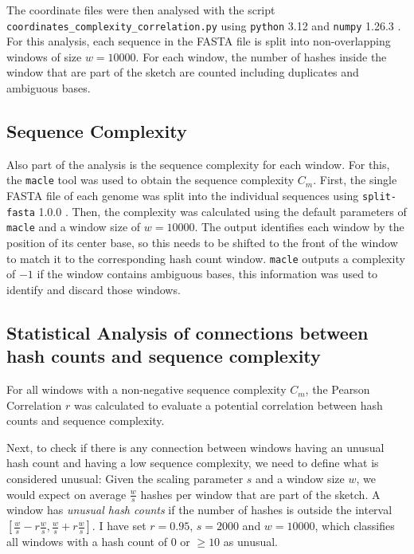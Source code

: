 The coordinate files were then analysed with the script
\texttt{coordinates\_complexity\_correlation.py} using \texttt{python} 3.12
\cite{vanrossumPythonReferenceManual2009} and \texttt{numpy} 1.26.3
\cite{ArrayProgrammingNumPy}. For this analysis, each sequence in the FASTA file
is split into non-overlapping windows of size $w=10000$. For each window, the
number of hashes inside the window that are part of the sketch are counted
including duplicates and ambiguous bases.

\subsection*{Sequence Complexity}
Also part of the analysis is the sequence complexity for each window. For this,
the \texttt{macle} tool \cite{pirogovHighcomplexityRegionsMammalian2019} was
used to obtain the sequence complexity $C_m$. First, the single FASTA file of
each genome was split into the individual sequences using \texttt{split-fasta}
1.0.0 \cite{vashishtSplitfasta2020}. Then, the complexity was calculated using
the default parameters of \texttt{macle} and a window size of $w=10000$. The
output identifies each window by the position of its center base, so this needs
to be shifted to the front of the window to match it to the corresponding hash
count window. \texttt{macle} outputs a complexity of $-1$ if the window contains
ambiguous bases, this information was used to identify and discard those
windows.

\subsection*{Statistical Analysis of connections between hash counts and sequence complexity}
For all windows with a non-negative sequence complexity $C_m$, the Pearson
Correlation $r$ was calculated to evaluate a potential correlation between hash
counts and sequence complexity.

Next, to check if there is any connection between windows having an unusual hash
count and having a low sequence complexity, we need to define what is considered
unusual: Given the scaling parameter $s$ and a window size $w$, we would expect
on average $\frac{w}{s}$ hashes per window that are part of the sketch. A window
has \textit{unusual hash counts} if the number of hashes is outside the interval
$[\frac{w}{s} - r \frac{w}{s}, \frac{w}{s} + r \frac{w}{s}]$. I have set
$r=0.95$, $s=2000$ and $w=10000$, which classifies all windows with a hash count
of $0$ or $\geq 10$ as unusual.

